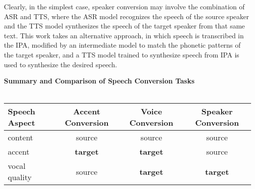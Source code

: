 Clearly, in the simplest case, speaker conversion may involve the combination of ASR and TTS, where the ASR model 
recognizes the speech of the source speaker and the TTS model synthesizes the speech of the target speaker from that same text.
This work takes an alternative approach, in which speech is transcribed in the IPA, 
modified by an intermediate model to match the phonetic patterns of the target speaker, and a TTS model trained 
to synthesize speech from IPA is used to synthesize the desired speech.

\begin{center}
  \textbf{Summary and Comparison of Speech Conversion Tasks}\\~\\
  \begin{tabular}{l|c|c|c}
      Speech Aspect   & Accent Conversion & Voice Conversion & Speaker Conversion \\\hline
      content         & source & source & source \\
      accent          & \textbf{target} & \textbf{target} & source \\
      vocal quality   & source & \textbf{target} & \textbf{target} \\
    \end{tabular}
  \end{center}
